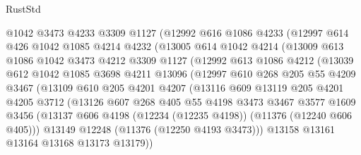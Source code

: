 \begin{lexlean}{RustStd}
\begin{coremodule}
{{{{{{{{{{{{{{{{{{{            @1042
            @3473
            @4233
            @3309
            @1127
            (@12992
              @616
              @1086
              @4233
              (@12997
                @614
                @426
                @1042
                @1085
                @4214
                @4232
                (@13005
                  @614
                  @1042
                  @4214
                  (@13009
                    @613
                    @1086
                    @1042
                    @3473
                    @4212
                    @3309
                    @1127
                    (@12992
                      @613
                      @1086
                      @4212
                      (@13039
                        @612
                        @1042
                        @1085
                        @3698
                        @4211
                        @13096
                        (@12997
                          @610
                          @268
                          @205
                          @55
                          @4209
                          @3467
                          (@13109
                            @610
                            @205
                            @4201
                            @4207
                            (@13116
                              @609
                              @13119
                              @205
                              @4201
                              @4205
                              @3712
                              (@13126
                                @607
                                @268
                                @405
                                @55
                                @4198
                                @3473
                                @3467
                                @3577
                                @1609
                                @3456
                                (@13137
                                  @606
                                  @4198
                                  (@12234 (@12235 @4198))
                                  (@11376 (@12240 @606 @405)))
                                @13149
                                @12248
                                (@11376 (@12250 @4193 @3473)))
                              @13158
                              @13161
                              @13164
                              @13168
                              @13173
                              @13179))
}}}}}}}}}}}}}}}}}}}
\end{coremodule}
\end{lexlean}
